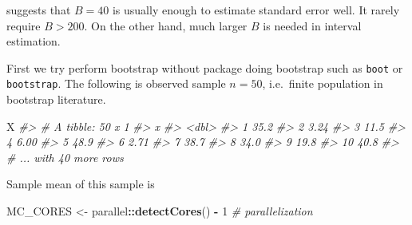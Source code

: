 \documentclass[]{book}
\newenvironment{Shaded}{\begin{snugshade}}{\end{snugshade}}
\newcommand{\CommentTok}[1]{\textcolor[rgb]{0.56,0.35,0.01}{\textit{#1}}}
\newcommand{\ControlFlowTok}[1]{\textcolor[rgb]{0.13,0.29,0.53}{\textbf{#1}}}
\newcommand{\DataTypeTok}[1]{\textcolor[rgb]{0.13,0.29,0.53}{#1}}
\newcommand{\DecValTok}[1]{\textcolor[rgb]{0.00,0.00,0.81}{#1}}
\newcommand{\KeywordTok}[1]{\textcolor[rgb]{0.13,0.29,0.53}{\textbf{#1}}}
\newcommand{\NormalTok}[1]{#1}
\newcommand{\OperatorTok}[1]{\textcolor[rgb]{0.81,0.36,0.00}{\textbf{#1}}}
\newcommand{\OtherTok}[1]{\textcolor[rgb]{0.56,0.35,0.01}{#1}}
\newcommand{\StringTok}[1]{\textcolor[rgb]{0.31,0.60,0.02}{#1}}
\theoremstyle{definition}
\theoremstyle{definition}
\theoremstyle{definition}
\theoremstyle{remark}
\begin{document}
\citet{Efron:1994aa} suggests that \(B = 40\) is usually enough to estimate standard error well. It rarely require \(B > 200\). On the other hand, much larger \(B\) is needed in interval estimation.

First we try perform bootstrap without package doing bootstrap such as \texttt{boot} or \texttt{bootstrap}. The following is observed sample \(n = 50\), i.e.~finite population in bootstrap literature.

\begin{Shaded}
\begin{Highlighting}[]
\NormalTok{X}
\CommentTok{#> # A tibble: 50 x 1}
\CommentTok{#>        x}
\CommentTok{#>    <dbl>}
\CommentTok{#>  1 35.2 }
\CommentTok{#>  2  3.24}
\CommentTok{#>  3 11.5 }
\CommentTok{#>  4  6.00}
\CommentTok{#>  5 48.9 }
\CommentTok{#>  6  2.71}
\CommentTok{#>  7 38.7 }
\CommentTok{#>  8 34.0 }
\CommentTok{#>  9 19.8 }
\CommentTok{#> 10 40.8 }
\CommentTok{#> # ... with 40 more rows}
\end{Highlighting}
\end{Shaded}

Sample mean of this sample is

\begin{Shaded}
\end{Shaded}

\begin{Shaded}
\begin{Highlighting}[]
\NormalTok{MC_CORES <-}\StringTok{ }\NormalTok{parallel}\OperatorTok{::}\KeywordTok{detectCores}\NormalTok{() }\OperatorTok{-}\StringTok{ }\DecValTok{1} \CommentTok{# parallelization}
\end{Highlighting}
\end{Shaded}

\begin{Shaded}
\end{Shaded}
\end{document}
